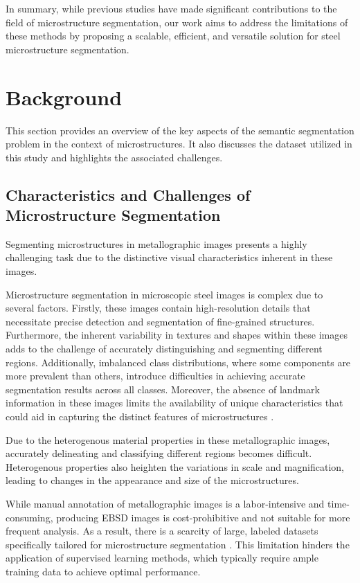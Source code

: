 \documentclass[]{article}
\begin{document}
In summary, while previous studies have made significant contributions to the field of microstructure segmentation, our work aims to address the limitations of these methods by proposing a scalable, efficient, and versatile solution for steel microstructure segmentation.

\section{Background}
This section provides an overview of the key aspects of the semantic segmentation problem in the context of microstructures. It also discusses the dataset utilized in this study and highlights the associated challenges.
\subsection{Characteristics and Challenges of Microstructure Segmentation}
Segmenting microstructures in metallographic images presents a highly challenging task due to the distinctive visual characteristics inherent in these images.

Microstructure segmentation in microscopic steel images is complex due to several factors. Firstly, these images contain high-resolution details that necessitate precise detection and segmentation of fine-grained structures. Furthermore, the inherent variability in textures and shapes within these images adds to the challenge of accurately distinguishing and segmenting different regions. Additionally, imbalanced class distributions, where some components are more prevalent than others, introduce difficulties in achieving accurate segmentation results across all classes. Moreover, the absence of landmark information in these images limits the availability of unique characteristics that could aid in capturing the distinct features of microstructures \cite{LUENGO2022232}.

Due to the heterogenous material properties in these metallographic images, accurately delineating and classifying different regions becomes difficult. Heterogenous properties also heighten the variations in scale and magnification, leading to changes in the appearance and size of the microstructures.

While manual annotation of metallographic images is a labor-intensive and time-consuming, producing EBSD images is cost-prohibitive and not suitable for more frequent analysis. As a result, there is a scarcity of large, labeled datasets specifically tailored for microstructure segmentation \cite{Roberts2019}. This limitation hinders the application of supervised learning methods, which typically require ample training data to achieve optimal performance.
\end{document}
